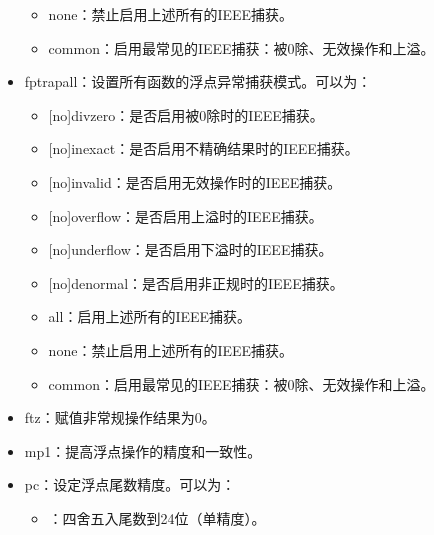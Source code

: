 \documentclass[a4paper,12pt,english]{sphinxmanual}
\begin{document}
\begin{itemize}
\begin{itemize}
\item {} 
\sphinxAtStartPar
none：禁止启用上述所有的IEEE捕获。

\item {} 
\sphinxAtStartPar
common：启用最常见的IEEE捕获：被0除、无效操作和上溢。

\end{itemize}

\item {} 
\sphinxAtStartPar
\sphinxhyphen{}fp\sphinxhyphen{}trap\sphinxhyphen{}all：设置所有函数的浮点异常捕获模式。可以为：
\begin{itemize}
\item {} 
\sphinxAtStartPar
{[}no{]}divzero：是否启用被0除时的IEEE捕获。

\item {} 
\sphinxAtStartPar
{[}no{]}inexact：是否启用不精确结果时的IEEE捕获。

\item {} 
\sphinxAtStartPar
{[}no{]}invalid：是否启用无效操作时的IEEE捕获。

\item {} 
\sphinxAtStartPar
{[}no{]}overflow：是否启用上溢时的IEEE捕获。

\item {} 
\sphinxAtStartPar
{[}no{]}underflow：是否启用下溢时的IEEE捕获。

\item {} 
\sphinxAtStartPar
{[}no{]}denormal：是否启用非正规时的IEEE捕获。

\item {} 
\sphinxAtStartPar
all：启用上述所有的IEEE捕获。

\item {} 
\sphinxAtStartPar
none：禁止启用上述所有的IEEE捕获。

\item {} 
\sphinxAtStartPar
common：启用最常见的IEEE捕获：被0除、无效操作和上溢。

\end{itemize}

\item {} 
\sphinxAtStartPar
\sphinxhyphen{}ftz：赋值非常规操作结果为0。

\item {} 
\sphinxAtStartPar
\sphinxhyphen{}mp1：提高浮点操作的精度和一致性。

\item {} 
\sphinxAtStartPar
\sphinxhyphen{}pc：设定浮点尾数精度。可以为：
\begin{itemize}
\item {} 
：四舍五入尾数到24位（单精度）。


\end{itemize}
\end{itemize}
\end{document}
